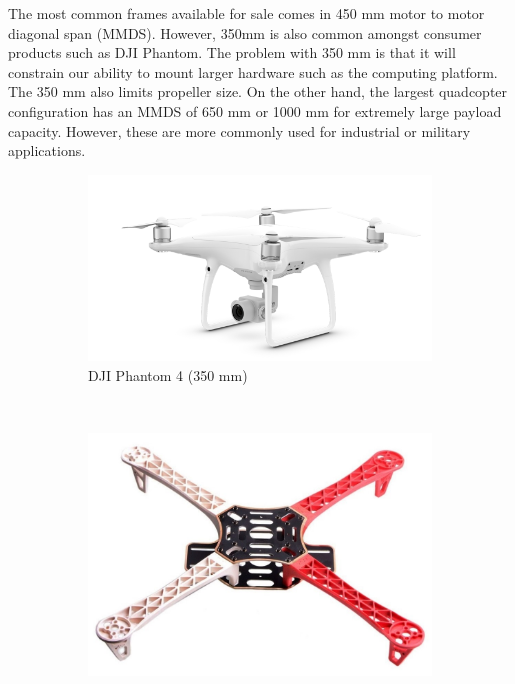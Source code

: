 The most common frames available for sale comes in 450 mm motor to motor diagonal span (MMDS). However, 
350mm is also common amongst consumer products such as DJI Phantom. The problem with 350 mm is that it will 
constrain our ability to mount larger hardware such as the computing platform. The 350 mm also limits 
propeller size. On the other hand, the largest quadcopter configuration has an MMDS of 650 mm or 1000 mm 
for extremely large payload capacity. However, these are more commonly used for industrial or military 
applications.

\begin{figure}[H]
    \centering
    \begin{subfigure}[b]{0.33\textwidth}
        \centering
        \includegraphics[width=\textwidth]{img/djiphantom4}
        \caption{DJI Phantom 4 (350 mm)}
    \end{subfigure}
    ~
    \begin{subfigure}[b]{0.33\textwidth}
        \centering
        \includegraphics[width=\textwidth]{img/f450frame}

\end{subfigure}
\end{figure}
